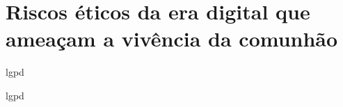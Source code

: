 \newpage
\section{Riscos éticos da era digital que ameaçam a vivência da comunhão}

\gls{lgpd}

\gls{lgpd}

\cite{cfw}
